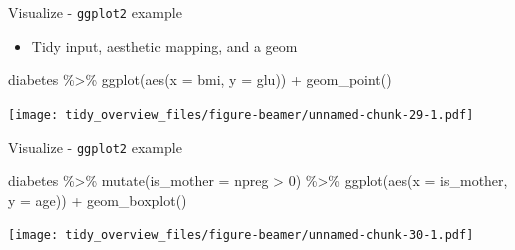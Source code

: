 \documentclass[
  ignorenonframetext,
]{beamer}
\newenvironment{Shaded}{\begin{snugshade}}{\end{snugshade}}
\newcommand{\AttributeTok}[1]{\textcolor[rgb]{0.77,0.63,0.00}{#1}}
\newcommand{\DecValTok}[1]{\textcolor[rgb]{0.00,0.00,0.81}{#1}}
\newcommand{\FunctionTok}[1]{\textcolor[rgb]{0.00,0.00,0.00}{#1}}
\newcommand{\NormalTok}[1]{#1}
\newcommand{\SpecialCharTok}[1]{\textcolor[rgb]{0.00,0.00,0.00}{#1}}
\providecommand{\tightlist}{%
  \setlength{\itemsep}{0pt}\setlength{\parskip}{0pt}}
\begin{document}
\begin{frame}[fragile]{Visualize - \texttt{ggplot2} example}
\protect\hypertarget{visualize---ggplot2-example}{}
\begin{itemize}
\tightlist
\item
  Tidy input, aesthetic mapping, and a geom
\end{itemize}

\begin{Shaded}
\begin{Highlighting}[]
\NormalTok{diabetes }\SpecialCharTok{\%\textgreater{}\%} 
  \FunctionTok{ggplot}\NormalTok{(}\FunctionTok{aes}\NormalTok{(}\AttributeTok{x =}\NormalTok{ bmi, }\AttributeTok{y =}\NormalTok{ glu)) }\SpecialCharTok{+} 
  \FunctionTok{geom\_point}\NormalTok{()}
\end{Highlighting}
\end{Shaded}

\texttt{[image: tidy\_overview\_files/figure-beamer/unnamed-chunk-29-1.pdf]}
\end{frame}

\begin{frame}[fragile]{Visualize - \texttt{ggplot2} example}
\protect\hypertarget{visualize---ggplot2-example-1}{}
\begin{Shaded}
\begin{Highlighting}[]
\NormalTok{diabetes }\SpecialCharTok{\%\textgreater{}\%} 
  \FunctionTok{mutate}\NormalTok{(}\AttributeTok{is\_mother =}\NormalTok{ npreg }\SpecialCharTok{\textgreater{}} \DecValTok{0}\NormalTok{) }\SpecialCharTok{\%\textgreater{}\%} 
  \FunctionTok{ggplot}\NormalTok{(}\FunctionTok{aes}\NormalTok{(}\AttributeTok{x =}\NormalTok{ is\_mother, }\AttributeTok{y =}\NormalTok{ age)) }\SpecialCharTok{+} 
  \FunctionTok{geom\_boxplot}\NormalTok{()}
\end{Highlighting}
\end{Shaded}

\texttt{[image: tidy\_overview\_files/figure-beamer/unnamed-chunk-30-1.pdf]}
\end{frame}
\end{document}
